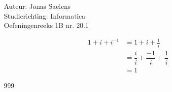 \documentclass[a4paper]{article}
\begin{document}
\noindent \large Auteur: Jonas Saelens \\
\noindent \large Studierichting: Informatica\\
\noindent \large Oefeningenreeks 1B nr. 20.1\\

\medskip

\normalsize

\[
\begin{aligned}
1 + i + i^{-1}
&= 1 + i + \frac{1}{i} \\
&= \dfrac{i}{i} + \dfrac{-1}{i} + \dfrac{1}{i} \\
&= 1
\end{aligned}
\]

\begin{thebibliography}{999}
\end{thebibliography}
\end{document}
